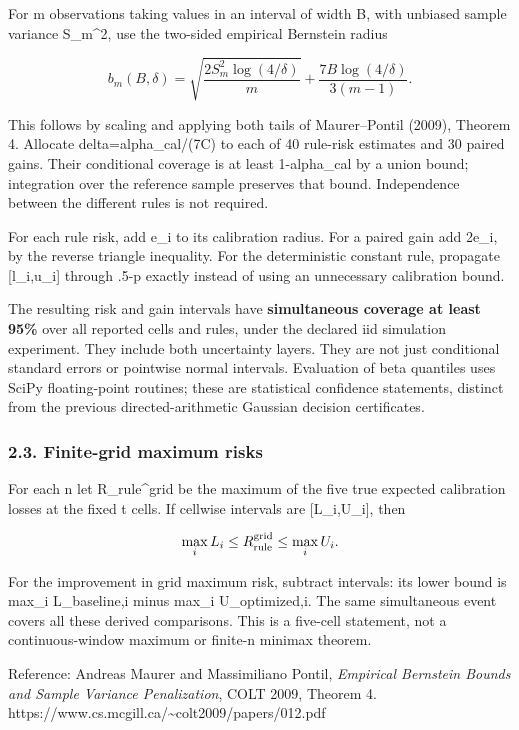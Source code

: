 For m observations taking values in an interval of width B, with
unbiased sample variance S\_m\^{}2, use the two-sided empirical
Bernstein radius

\[
b_m(B,\delta)=\sqrt{\frac{2S_m^2\log(4/\delta)}m}
+\frac{7B\log(4/\delta)}{3(m-1)}.
\]

This follows by scaling and applying both tails of Maurer--Pontil
(2009), Theorem 4. Allocate delta=alpha\_cal/(7C) to each of 40
rule-risk estimates and 30 paired gains. Their conditional coverage is
at least 1-alpha\_cal by a union bound; integration over the reference
sample preserves that bound. Independence between the different rules is
not required.

For each rule risk, add e\_i to its calibration radius. For a paired
gain add 2e\_i, by the reverse triangle inequality. For the
deterministic constant rule, propagate {[}l\_i,u\_i{]} through
\textbar.5-p\textbar{} exactly instead of using an unnecessary
calibration bound.

The resulting risk and gain intervals have \textbf{simultaneous coverage
at least 95\%} over all reported cells and rules, under the declared iid
simulation experiment. They include both uncertainty layers. They are
not just conditional standard errors or pointwise normal intervals.
Evaluation of beta quantiles uses SciPy floating-point routines; these
are statistical confidence statements, distinct from the previous
directed-arithmetic Gaussian decision certificates.

\subsubsection{2.3. Finite-grid maximum
risks}\label{confirmation-finite-grid-maximum-risks}

For each n let R\_rule\^{}grid be the maximum of the five true expected
calibration losses at the fixed t cells. If cellwise intervals are
{[}L\_i,U\_i{]}, then

\[
\max_iL_i\le R_{\rm rule}^{\rm grid}\le\max_iU_i.
\]

For the improvement in grid maximum risk, subtract intervals: its lower
bound is max\_i L\_baseline,i minus max\_i U\_optimized,i. The same
simultaneous event covers all these derived comparisons. This is a
five-cell statement, not a continuous-window maximum or finite-n minimax
theorem.

Reference: Andreas Maurer and Massimiliano Pontil, \emph{Empirical
Bernstein Bounds and Sample Variance Penalization}, COLT 2009, Theorem
4. https://www.cs.mcgill.ca/\textasciitilde colt2009/papers/012.pdf

